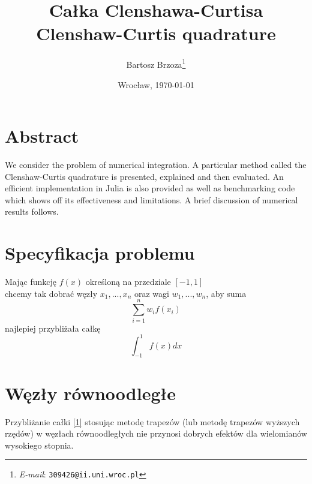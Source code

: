\documentclass[11pt,wide]{mwart}
\begin{document}
\date{Wrocław, \today}
\title{\LARGE\textbf{Całka Clenshawa-Curtisa}\\Clenshaw-Curtis quadrature}
\author{Bartosz Brzoza\thanks{\textit{E-mail}: \texttt{309426@ii.uni.wroc.pl}}}
\maketitle

\section{Abstract}
We consider the problem of numerical integration.
A particular method called the Clenshaw-Curtis quadrature is presented,
explained and then evaluated. An efficient implementation in Julia
is also provided as well as benchmarking code which shows off its effectiveness and limitations.
A brief discussion of numerical results follows.

\section{Specyfikacja problemu}
Mając funkcję $f(x)$ określoną na przedziale $[-1,1]$\\
chcemy tak dobrać węzły $x_1, ..., x_n$ oraz wagi $w_1, ..., w_n$, aby suma
$$\sum_{i=1}^n w_i f(x_i)$$
najlepiej przybliżała całkę
\begin{equation}
    \int_{-1}^1 f(x) dx \label{1}
\end{equation}

\section{Węzły równoodległe}
Przybliżanie całki \eqref{1} stosując metodę trapezów (lub metodę trapezów wyższych rzędów)
w węzłach równoodległych nie przynosi dobrych efektów dla wielomianów wysokiego stopnia.
\end{document}

